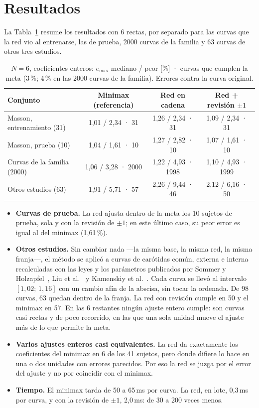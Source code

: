 \section{Resultados}
La Tabla~\ref{tab:resumen} resume los resultados con 6 rectas, por separado para las curvas que la red vio al entrenarse, las de prueba, 2000 curvas de la familia y 63 curvas de otros tres estudios.

\begin{table}[tb]\centering\small
\caption{$N=6$, coeficientes enteros: $e_{\max}$ mediano / peor [\%] · curvas que cumplen la meta (3\,\%; 4\,\% en las 2000 curvas de la familia). Errores contra la curva original.}\label{tab:resumen}
\begin{tabular}{lccc}\toprule
Conjunto & Minimax (referencia) & Red en cadena & Red + revisión $\pm1$\\\midrule
Masson, entrenamiento (31) & 1,01 / 2,34 · 31 & 1,26 / 2,34 · 31 & 1,09 / 2,34 · 31\\
Masson, prueba (10) & 1,04 / 1,61 · 10 & 1,27 / 2,82 · 10 & 1,07 / 1,61 · 10\\
Curvas de la familia (2000) & 1,06 / 3,28 · 2000 & 1,22 / 4,93 · 1998 & 1,10 / 4,93 · 1999\\
Otros estudios (63) & 1,91 / 5,71 · 57 & 2,26 / 9,44 · 46 & 2,12 / 6,16 · 50\\\bottomrule
\end{tabular}
\end{table}

\begin{itemize}
\item \textbf{Curvas de prueba.} La red ajusta dentro de la meta los 10 sujetos de prueba, sola y con la revisión de $\pm1$; en este último caso, su peor error es igual al del minimax (1,61\,\%).
\item \textbf{Otros estudios.} Sin cambiar nada ---la misma base, la misma red, la misma franja---, el método se aplicó a curvas de carótidas común, externa e interna recalculadas con las leyes y los parámetros publicados por Sommer y Holzapfel~\cite{sommer}, Liu et al.~\cite{liu} y Kamenskiy et al.~\cite{kamenskiy}. Cada curva se llevó al intervalo $[1{,}02;\,1{,}16]$ con un cambio afín de la abscisa, sin tocar la ordenada. De 98 curvas, 63 quedan dentro de la franja. La red con revisión cumple en 50 y el minimax en 57. En las 6 restantes ningún ajuste entero cumple: son curvas casi rectas y de poco recorrido, en las que una sola unidad mueve el ajuste más de lo que permite la meta.
\item \textbf{Varios ajustes enteros casi equivalentes.} La red da exactamente los coeficientes del minimax en 6 de los 41 sujetos, pero donde difiere lo hace en una o dos unidades con errores parecidos. Por eso la red se juzga por el error del ajuste y no por coincidir con el minimax.
\item \textbf{Tiempo.} El minimax tarda de 50 a 65\,ms por curva. La red, en lote, 0,3\,ms por curva, y con la revisión de $\pm1$, 2,0\,ms: de 30 a 200 veces menos.
\end{itemize}

